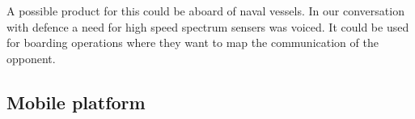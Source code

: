 \documentclass[a4paper, openany, oneside]{memoir}
\begin{document}
A possible product for this could be aboard of naval vessels. In our conversation with defence a need for high speed spectrum sensers was voiced. It could be used for boarding operations where they want to map the communication of the opponent.

\subsection{Mobile platform}
\label{sub:mobile_platform}
\end{document}
